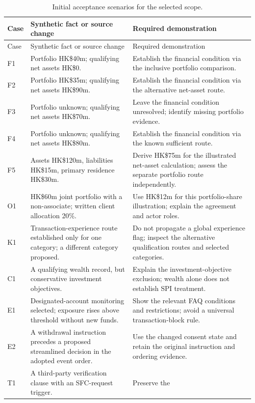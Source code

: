 \begingroup\small
\begin{longtable}{P{0.09\textwidth}P{0.41\textwidth}P{0.4\textwidth}}
\caption{Initial acceptance scenarios for the selected scope.}
\label{tab:cases}\\
\toprule Case & Synthetic fact or source change & Required demonstration \\\midrule
\endfirsthead
\toprule Case & Synthetic fact or source change & Required demonstration \\\midrule
\endhead
F1 & Portfolio HK\$40m; qualifying net assets HK\$0. & Establish the financial
condition via the inclusive portfolio comparison.\\
F2 & Portfolio HK\$35m; qualifying net assets HK\$90m. & Establish the financial
condition via the alternative net-asset route.\\
F3 & Portfolio unknown; qualifying net assets HK\$70m. & Leave the financial
condition unresolved; identify missing portfolio evidence.\\
F4 & Portfolio unknown; qualifying net assets HK\$80m. & Establish the financial
condition via the known sufficient route.\\
F5 & Assets HK\$120m, liabilities HK\$15m, primary residence HK\$30m. & Derive
HK\$75m for the illustrated net-asset calculation; assess the separate portfolio
route independently.\\
O1 & HK\$60m joint portfolio with a non-associate; written client allocation 20\%. &
Use HK\$12m for this portfolio-share illustration; explain the agreement and actor roles.\\
K1 & Transaction-experience route established only for one category; a different
category proposed. & Do not propagate a global experience flag; inspect the
alternative qualification routes and selected categories.\\
C1 & A qualifying wealth record, but conservative investment objectives. & Explain
the investment-objective exclusion; wealth alone does not establish SPI treatment.\\
E1 & Designated-account monitoring selected; exposure rises above threshold without
new funds. & Show the relevant FAQ conditions and restrictions; avoid a universal
transaction-block rule.\\
E2 & A withdrawal instruction precedes a proposed streamlined decision in the
adopted event order. & Use the changed consent state and retain the original
instruction and ordering evidence.\\
T1 & A third-party verification clause with an SFC-request trigger. & Preserve the

\end{longtable}
